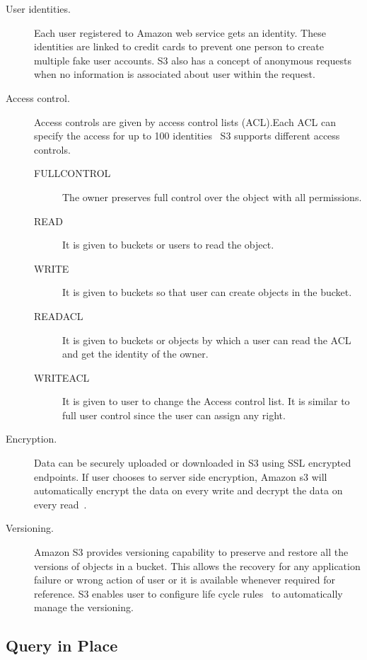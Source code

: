 \begin{description}

\item [User identities.] Each user registered to Amazon web service gets an 
identity. These identities are linked to credit cards to prevent one person to 
create multiple fake user accounts. S3 also has a concept of anonymous 
requests when no information is associated about user within the request.

\item [Access control.] Access controls are given by access control lists 
(ACL).Each ACL can specify the access for up to 100 
identities~\cite{hid-sp18-420-amazon-S3-details}
S3 supports different access controls.

\begin{description}
\item [FULLCONTROL] The owner preserves full control over the object with all 
permissions.
\item [READ] It is given to buckets or users to read the object.
\item [WRITE] It is given to buckets so that user can create objects in the 
bucket.
\item [READACL] It is given to buckets or objects by which a user can read the
ACL and get the identity of the owner.
\item [WRITEACL] It is given to user to change the Access control list. It is 
similar to full user control since the user can assign any right.
\end{description}

\item [Encryption.] Data can be securely uploaded or downloaded in S3 using 
SSL encrypted endpoints. If user chooses to server side encryption, 
Amazon s3 will 
automatically encrypt the data on every write and decrypt the data on every 
read~\cite{hid-sp18-420-amazon-S3-data-encryption}.

\item [Versioning.] Amazon S3 provides versioning capability to preserve and 
restore all the versions of objects in a bucket. This allows the recovery for 
any application failure or wrong action of user or it is available whenever 
required for reference. S3 enables user to configure life cycle 
rules~\cite{hid-sp18-420-amazon-S3-lidecycle-rule} to automatically manage the 
versioning.

\end{description}


\subsection{Query in Place} 

